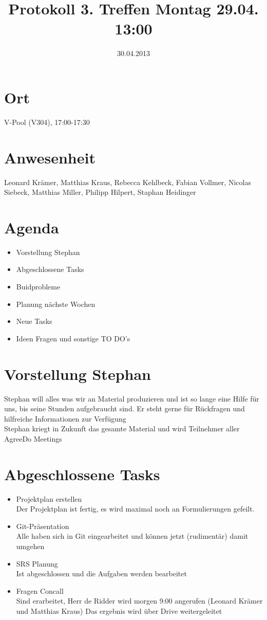 \documentclass{scrartcl}
\date{30.04.2013}
\title{Protokoll 3. Treffen Montag 29.04. 13:00}
\begin{document}
\maketitle
\section{Ort}
V-Pool (V304), 17:00-17:30
\section{Anwesenheit}
Leonard Krämer, Matthias Kraus, Rebecca Kehlbeck, Fabian Vollmer, Nicolas Siebeck, Matthias Miller, Philipp Hilpert, Staphan Heidinger
\section{Agenda}
\begin{itemize}
\item Vorstellung Stephan
\item Abgeschlossene Tasks
\item Buidprobleme
\item Planung nächste Wochen
\item Neue Tasks
\item Ideen Fragen und sonstige TO DO's
\end{itemize}
\section{Vorstellung Stephan}
Stephan will alles was wir an Material produzieren und ist so lange eine Hilfe für uns, bis seine Stunden aufgebraucht sind.
Er steht gerne für Rückfragen und hilfreiche Informationen zur Verfügung \\
Stephan kriegt in Zukunft das gesamte Material und wird Teilnehmer aller AgreeDo Meetings
\section{Abgeschlossene Tasks}
\begin{itemize}
\item Projektplan erstellen \\ Der Projektplan ist fertig, es wird maximal noch an Formulierungen gefeilt.
\item Git-Präsentation \\ Alle haben sich in Git eingearbeitet und können jetzt (rudimentär) damit umgehen
\item SRS Planung \\ Ist abgeschlossen und die Aufgaben werden bearbeitet
\item Fragen Concall \\ Sind erarbeitet, Herr de Ridder wird morgen 9:00 angerufen (Leonard Krämer und Matthias Kraus) Das ergebnis wird über Drive weitergeleitet
\end{itemize}
\end{document}
